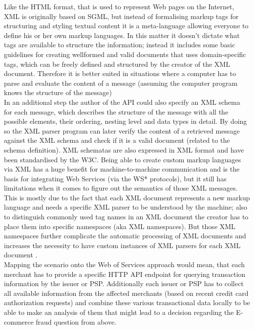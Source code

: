 Like the \gls{HTML} format, that is used to represent Web pages on the Internet, \gls{XML} is originally based on \gls{SGML}, but instead of formalising markup tags for structuring and styling textual content it is a meta-language allowing everyone to define his or her own markup languages. In this matter it doesn’t dictate what tags are available to structure the information; instead it includes some basic guidelines for creating wellformed and valid documents that uses domain-specific tags, which can be freely defined and structured by the creator of the XML document. Therefore it is better suited in situations where a computer has to parse and evaluate the content of a message (assuming the computer program knows the structure of the message) \\

In an additional step the author of the API could also specify an XML schema for each message, which describes the structure of the message with all the possible elements, their ordering, nesting level and data types in detail. By doing so the XML parser program can later verify the content of a retrieved message against the XML schema and check if it is a valid document (related to the schema definition). XML schematas are also expressed in XML format and have been standardised by the W3C. Being able to create custom markup languages via XML has a huge benefit for machine-to-machine communication and is the basis for integrating Web Services (via the WS* protocols), but it still has limitations when it comes to figure out the semantics of those XML messages. This is mostly due to the fact that each XML document represents a new markup language and needs a specific XML parser to be understood by the machine; also to distinguish commonly used tag names in an XML document the creator has to place them into specific namespaces (aka XML namespaces). But those XML namespaces further complicate the automatic processing of XML documents and increases the necessity to have custom instances of XML parsers for each XML document \citep{taylor2008p2p}. \\

Mapping the scenario onto the Web of Services approach would mean, that each merchant has to provide a specific \gls{HTTP} \gls{API} endpoint for querying transaction information by the issuer or \gls{PSP}. Additionally each issuer or \gls{PSP} has to collect all available information from the affected merchants (based on recent credit card authorization requests) and combine these various transactional data locally to be able to make an analysis of them that might lead to a decision regarding the E-commerce fraud question from above. \\

